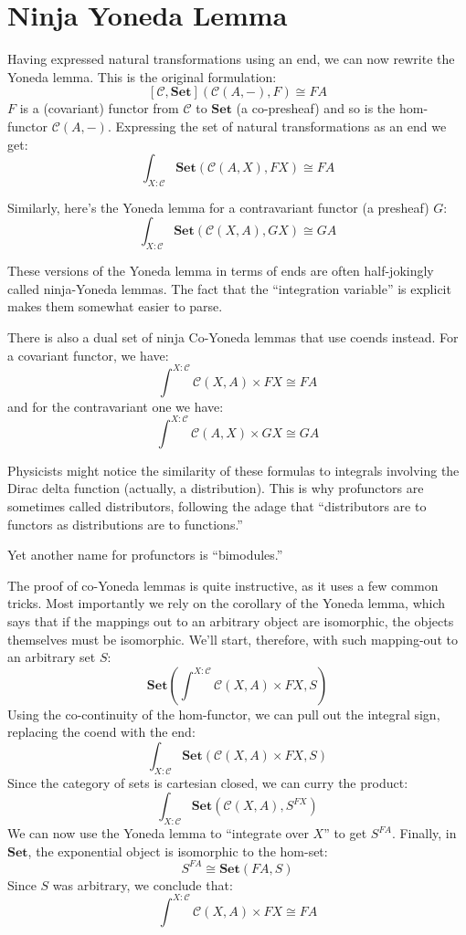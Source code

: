 \documentclass[DaoFP]{subfiles}
\begin{document}
\section{Ninja Yoneda Lemma}

Having expressed natural transformations using an end, we can now rewrite the Yoneda lemma. This is the original formulation:
\[ [\mathcal{C}, \mathbf{Set}]( \mathcal{C}(A, -), F) \cong F A \]
$F$ is a (covariant) functor from $\mathcal{C}$ to $\mathbf{Set}$ (a co-presheaf) and so is the hom-functor $\mathcal{C}(A, -)$. 
Expressing the set of natural transformations as an end we get:
\[ \int_{X \colon \mathcal{C}} \mathbf{Set} (\mathcal{C}(A, X), FX) \cong FA \]

Similarly, here's the Yoneda lemma for a contravariant functor (a presheaf) $G$:
\[ \int_{X \colon \mathcal{C}} \mathbf{Set} (\mathcal{C}(X, A), GX) \cong GA \]

These versions of the Yoneda lemma in terms of ends are often half-jokingly called ninja-Yoneda lemmas. The fact that the ``integration variable'' is explicit makes them somewhat easier to parse.

There is also a dual set of ninja Co-Yoneda lemmas that use coends instead. For a covariant functor, we have:
\[ \int^{X \colon \mathcal{C}} \mathcal{C}(X, A) \times F X \cong F A \]
and for the contravariant one we have:
\[ \int^{X \colon \mathcal{C}} \mathcal{C}(A, X) \times G X \cong G A \]

Physicists might notice the similarity of these formulas to integrals involving the Dirac delta function (actually, a distribution). This is why profunctors are sometimes called distributors, following the adage that ``distributors are to functors as distributions are to functions.'' 

Yet another name for profunctors is ``bimodules.''

The proof of co-Yoneda lemmas is quite instructive, as it uses a few common tricks. Most importantly we rely on the corollary of the Yoneda lemma, which says that if the mappings out to an arbitrary object are isomorphic, the objects themselves must be isomorphic. We'll start, therefore, with such mapping-out to an arbitrary set $S$:
\[ \mathbf{Set} \left(\int^{X \colon \mathcal{C}} \mathcal{C}(X, A) \times F X, S \right) \]
Using the co-continuity of the hom-functor, we can pull out the integral sign, replacing the coend with the end:
\[ \int_{X \colon \mathcal{C}} \mathbf{Set} \left( \mathcal{C}(X, A) \times F X, S \right) \]
Since the category of sets is cartesian closed, we can curry the product:
\[ \int_{X \colon \mathcal{C}} \mathbf{Set} \left( \mathcal{C}(X, A) , S^{FX} \right) \]
We can now use the Yoneda lemma to ``integrate over $X$'' to get $S^{FA}$. Finally, in $\mathbf{Set}$, the exponential object is isomorphic to the hom-set:
\[S^{FA} \cong \mathbf{Set}(F A, S)\]
Since $S$ was arbitrary, we conclude that:
\[ \int^{X \colon \mathcal{C}} \mathcal{C}(X, A) \times F X \cong F A \]
\end{document}
